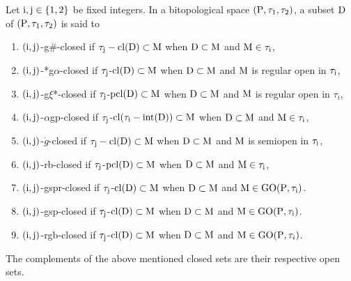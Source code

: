 \begin{dfn}\label{dfn1.6.1}
Let $\mathrm{i}, \mathrm{j}\in \{1, 2\}$ be fixed integers. In a bitopological space $(\mathrm{P}, \tau_1, \tau_2)$, a subset $\mathrm{D}$ of $(\mathrm{P}, \tau_1, \tau_2)$ is said to
\begin{enumerate}[\rm (i)]
\item $(\mathrm{i}, \mathrm{j})$-g\#-closed \cite{Veerakumar} if $\tau_{\mathrm{j}}- \mathrm{cl}(\mathrm{D})\subset \mathrm{M}$ when $\mathrm{D}\subset\mathrm{M}$ and $\mathrm{M}\in \tau_{\mathrm{i}}$,
\item $(\mathrm{i}, \mathrm{j})$-*g$\alpha$-closed \cite{Vigneshwaran} if $\tau_{\mathrm{j}}$-$\mathrm{cl}(\mathrm{D})\subset\mathrm{M}$ when $\mathrm{D}\subset\mathrm{M}$ and $\mathrm{M}$ is regular open in $\tau_{\mathrm{i}}$,
\item $(\mathrm{i}, \mathrm{j})$-g$\xi$*-closed \cite{Kokilavani} if $\tau_{\mathrm{j}}$-$\mbox{pcl}(\mathrm{D}) \subset\mathrm{M}$ when $\mathrm{D}\subset\mathrm{M}$ and $\mathrm{M}$ is regular open in $\tau_i$,
\item $(\mathrm{i}, \mathrm{j})$-$\alpha$gp-closed \cite{Navalagi2} if $\tau_{\mathrm{j}}$-$\mathrm{cl}(\tau_{\mathrm{i}}-\mbox{int}(\mathrm{D}))\subset\mathrm{M}$ when $\mathrm{D}\subset\mathrm{M}$ and $\mathrm{M}\in\tau_{\mathrm{i}}$,
\item $(\mathrm{i}, \mathrm{j})$-$\ddot{g}$-closed \cite{key} if $\tau_{\mathrm{j}}-\mathrm{cl}(\mathrm{D}) \subset \mathrm{M}$ when $\mathrm{D}\subset\mathrm{M}$ and $\mathrm{M}$ is semiopen in $\tau_{\mathrm{i}}$,
\item $(\mathrm{i}, \mathrm{j})$-rb-closed \cite{Nagaveni2} if $\tau_{\mathrm{j}}$-$\mbox{pcl}(\mathrm{D}) \subset\mathrm{M}$ when $\mathrm{D}\subset\mathrm{M}$ and $\mathrm{M}\in\tau_{\mathrm{i}}$,
\item $(\mathrm{i}, \mathrm{j})$-gspr-closed \cite{Navalagi} if $\tau_{\mathrm{j}}$-$\mathrm{cl}(\mathrm{D}) \subset \mathrm{M}$ when $\mathrm{D} \subset \mathrm{M}$ and $\mathrm{M}\in\mbox{GO}(\mathrm{P}, \tau_{\mathrm{i}})$.
\item $(\mathrm{i}, \mathrm{j})$-gsp-closed \cite{Dontchev} if $\tau_{\mathrm{j}}$-$\mathrm{cl}(\mathrm{D}) \subset \mathrm{M}$ when $\mathrm{D} \subset \mathrm{M}$ and $\mathrm{M}\in \mbox{GO}(\mathrm{P}, \tau_{\mathrm{i}})$.
\item $(\mathrm{i}, \mathrm{j})$-rgb-closed \cite{Mariappa} if $\tau_{\mathrm{j}}$-$\mathrm{cl}(\mathrm{D}) \subset \mathrm{M}$ when $\mathrm{D} \subset \mathrm{M}$ and $\mathrm{M}\in \mbox{GO}(\mathrm{P}, \tau_i)$.
\end{enumerate}
\end{dfn}

The complements of the above mentioned closed sets are their respective open sets. 

